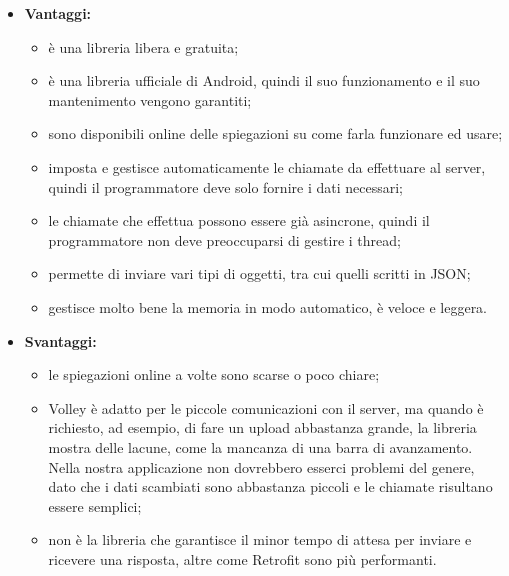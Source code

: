	\begin{itemize}
		\item \textbf{Vantaggi:}
			\begin{itemize}
				\item è una libreria libera e gratuita;
				\item è una libreria ufficiale di Android, quindi il suo funzionamento e il suo mantenimento vengono garantiti;
				\item sono disponibili online delle spiegazioni su come farla funzionare ed usare;
				\item imposta e gestisce automaticamente le chiamate da effettuare al server, quindi il programmatore deve solo fornire i dati necessari;
				\item le chiamate che effettua possono essere già asincrone, quindi il programmatore non deve preoccuparsi di gestire i thread;
				\item permette di inviare vari tipi di oggetti, tra cui quelli scritti in JSON;
				\item gestisce molto bene la memoria in modo automatico, è veloce e leggera.
			\end{itemize}
		\item \textbf{Svantaggi:}
			\begin{itemize}
				\item le spiegazioni online a volte sono scarse o poco chiare;
				\item Volley è adatto per le piccole comunicazioni con il server, ma quando è richiesto, ad esempio, di fare un upload abbastanza grande, la libreria mostra delle lacune, come la mancanza di una barra di avanzamento. Nella nostra applicazione non dovrebbero esserci problemi del genere, dato che i dati scambiati sono abbastanza piccoli e le chiamate risultano essere semplici;
				\item non è la libreria che garantisce il minor tempo di attesa per inviare e ricevere una risposta, altre come Retrofit sono più performanti.
			\end{itemize}
	\end{itemize}
	
	
	
	
	